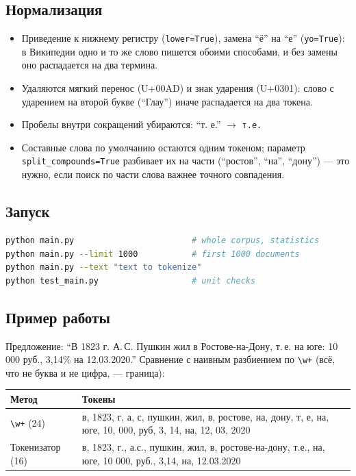 \subsection{Нормализация}
\begin{itemize}
    \item Приведение к нижнему регистру (\texttt{lower=True}), замена \enquote{ё} на
    \enquote{е} (\texttt{yo=True}): в Википедии одно и то же слово пишется обоими
    способами, и без замены оно распадается на два термина.
    \item Удаляются мягкий перенос (U+00AD) и знак ударения (U+0301):
    слово с ударением на второй букве (\enquote{Глау}) иначе распадается на два токена.
    \item Пробелы внутри сокращений убираются: \enquote{т. е.} $\to$ \texttt{т.е.}
    \item Составные слова по умолчанию остаются одним токеном; параметр
    \texttt{split\_}\allowbreak\texttt{compounds=True} разбивает их на части (\enquote{ростов},
    \enquote{на}, \enquote{дону}) --- это нужно, если поиск по части слова важнее
    точного совпадения.
\end{itemize}

\subsection{Запуск}
\begin{lstlisting}[language=bash]
python main.py                        # whole corpus, statistics
python main.py --limit 1000           # first 1000 documents
python main.py --text "text to tokenize"
python test_main.py                   # unit checks
\end{lstlisting}

\subsection{Пример работы}
Предложение: \enquote{В 1823 г. А.\,С. Пушкин жил в Ростове-на-Дону, т.\,е. на юге:
10 000 руб., 3,14\% на 12.03.2020.} Сравнение с наивным разбиением по
\texttt{\textbackslash w+} (всё, что не буква и не цифра, --- граница):

\begin{longtable}{|p{3.2cm}|p{11.1cm}|}
\hline
\textbf{Метод} & \textbf{Токены} \\ \hline
\texttt{\textbackslash w+} (24) & в, 1823, г, а, с, пушкин, жил, в, ростове, на, дону, т, е, на, юге,
10, 000, руб, 3, 14, на, 12, 03, 2020 \\ \hline
Токенизатор (16) & в, 1823, г., а.с., пушкин, жил, в, ростове-на-дону, т.е., на, юге,
10 000, руб., 3,14, на, 12.03.2020 \\ \hline
\end{longtable}

